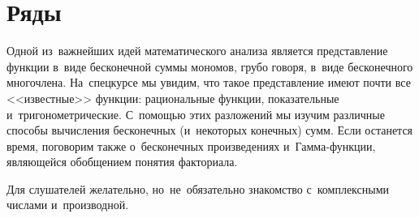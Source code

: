 
\section*{Ряды}



Одной из~важнейших идей математического анализа является представление функции
в~виде бесконечной суммы мономов, грубо говоря, в~виде бесконечного многочлена.
На~спецкурсе мы увидим, что такое представление имеют почти все <<известные>>
функции: рациональные функции, показательные и~тригонометрические.
С~помощью этих разложений мы изучим различные способы вычисления бесконечных
(и~некоторых конечных) сумм.
Если останется время, поговорим также о~бесконечных произведениях
и~Гамма-функции, являющейся обобщением понятия факториала.

Для слушателей желательно, но~не~обязательно знакомство с~комплексными числами
и~производной.

